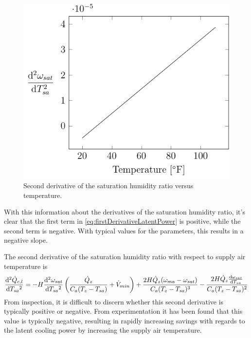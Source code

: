 \begin{figure}
\centering
\includegraphics{Plots/46-SecondDerivativeSaturatedHumidityVsTemperature/secondDerivativeSaturatedHumidity.pdf}
\caption{Second derivative of the saturation humidity ratio versus temperature.}
\label{fig:secondDeriviativeSaturationHumidityRatioVsTemperature}
\end{figure}

With this information about the derivatives of the saturation humidity
ratio, it's clear that the first term in 
\ref{eq:firstDerivativeLatentPower} is positive, while the second term
is negative. With typical values for the parameters, this results in a
negative slope. 

The second derivative of the saturation humidity ratio with respect to
supply air temperature is
\begin{equation}
    \dv[2]{\dot{Q}_{c,l}}{T_{sa}{}}  =  -H \dv[2]{\omega_{sat}}{T_{sa}{}} \left(\frac{\dot{Q}_{z}}{C_{a}
            (T_{z}-T_{sa}{})}+\dot{V}_{min}\right)+\frac{2 H
            \dot{Q}_{z} (\omega_{ma}-\omega_{sat})}{C_{a}
            (T_{z}-T_{sa}{})^3}-\frac{2 H \dot{Q}_{z}
        \dv{\omega_{sat}}{T_{sa}{}}}{C_{a} (T_{z}-T_{sa}{})^2}
\end{equation}
From inspection, it is difficult to discern whether this second
derivative is typically positive or negative. From experimentation it
has been found that this value is typically negative, resulting in
rapidly increasing savings with regards to the latent cooling power by
increasing the supply air temperature. 

